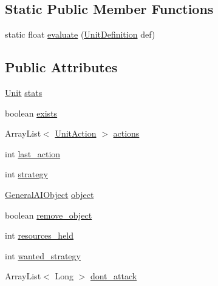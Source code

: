 \subsection*{Static Public Member Functions}
\begin{DoxyCompactItemize}
\item 
static float \hyperlink{classai_1_1general_1_1_general_a_i_unit_a96b64cf0fda20179721862a55b87a9fd}{evaluate} (\hyperlink{classrts_1_1units_1_1_unit_definition}{UnitDefinition} def)
\end{DoxyCompactItemize}
\subsection*{Public Attributes}
\begin{DoxyCompactItemize}
\item 
\hyperlink{classrts_1_1units_1_1_unit}{Unit} \hyperlink{classai_1_1general_1_1_general_a_i_unit_aa117dac9c797112c91e035b392fb5dde}{stats}
\item 
boolean \hyperlink{classai_1_1general_1_1_general_a_i_unit_a3268e3a735e33cc028a998cea762dd7d}{exists}
\item 
ArrayList$<$ \hyperlink{classrts_1_1units_1_1_unit_action}{UnitAction} $>$ \hyperlink{classai_1_1general_1_1_general_a_i_unit_ac94f90e9827f597b1c8bf50b43b5fe7c}{actions}
\item 
int \hyperlink{classai_1_1general_1_1_general_a_i_unit_acd9867f2587b949768f67f3c38367275}{last\_\-action}
\item 
int \hyperlink{classai_1_1general_1_1_general_a_i_unit_ae763c73974ba06f4a3578e6dd3b0ff3e}{strategy}
\item 
\hyperlink{classai_1_1general_1_1_general_a_i_object}{GeneralAIObject} \hyperlink{classai_1_1general_1_1_general_a_i_unit_a9dce2b60192207869f5ce328141109dd}{object}
\item 
boolean \hyperlink{classai_1_1general_1_1_general_a_i_unit_a4dc3dee95c57ff68b980e24ca52bdefa}{remove\_\-object}
\item 
int \hyperlink{classai_1_1general_1_1_general_a_i_unit_ab7a37df2a99bf4d6c18cbbb1477cf0c8}{resources\_\-held}
\item 
int \hyperlink{classai_1_1general_1_1_general_a_i_unit_ac9dd9c31d79a3d6bac5d9f7aa3b4a64a}{wanted\_\-strategy}
\item 
ArrayList$<$ Long $>$ \hyperlink{classai_1_1general_1_1_general_a_i_unit_a27d57b02a0a0c05eead8d64031551a77}{dont\_\-attack}
\end{DoxyCompactItemize}
